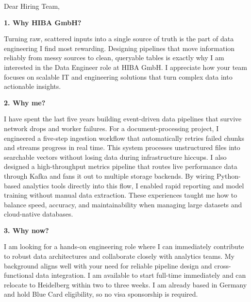 \documentclass[11pt,a4paper]{coverletter}
\begin{document}

\opening{Dear Hiring Team,}

\vspace{8pt}\noindent\textbf{1. Why HIBA GmbH?}\par\vspace{3pt}

Turning raw, scattered inputs into a single source of truth is the part of data engineering I find most rewarding. Designing pipelines that move information reliably from messy sources to clean, queryable tables is exactly why I am interested in the Data Engineer role at HIBA GmbH. I appreciate how your team focuses on scalable IT and engineering solutions that turn complex data into actionable insights.

\vspace{8pt}\noindent\textbf{2. Why me?}\par\vspace{3pt}

I have spent the last five years building event-driven data pipelines that survive network drops and worker failures. For a document-processing project, I engineered a five-step ingestion workflow that automatically retries failed chunks and streams progress in real time. This system processes unstructured files into searchable vectors without losing data during infrastructure hiccups. I also designed a high-throughput metrics pipeline that routes live performance data through Kafka and fans it out to multiple storage backends. By wiring Python-based analytics tools directly into this flow, I enabled rapid reporting and model training without manual data extraction. These experiences taught me how to balance speed, accuracy, and maintainability when managing large datasets and cloud-native databases.

\vspace{8pt}\noindent\textbf{3. Why now?}\par\vspace{3pt}

I am looking for a hands-on engineering role where I can immediately contribute to robust data architectures and collaborate closely with analytics teams. My background aligns well with your need for reliable pipeline design and cross-functional data integration. I am available to start full-time immediately and can relocate to Heidelberg within two to three weeks. I am already based in Germany and hold Blue Card eligibility, so no visa sponsorship is required.
\end{document}
